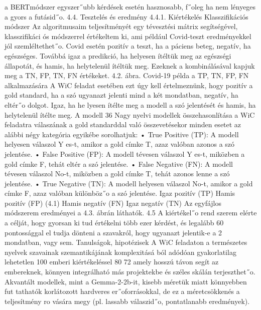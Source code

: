 \documentclass[12pt]{report}
\theoremstyle{definition}
\begin{document}
 a BERTmódszer egyszer˝ubb kérdések esetén hasznosabb, f˝oleg ha nem lényeges a gyors
 a futásid˝o.
 4.4. Tesztelés és eredmény
 4.4.1. Kiértékelés
 Klasszifikációs módszer
 Az algoritmusaim teljesítményét egy tévesztési mátrix segítségével, klasszifikáci
ós módszerrel értékeltem ki, ami például Covid-teszt eredményekkel jól szemléltethet˝o.
 Covid esetén pozitív a teszt, ha a páciens beteg, negatív, ha egészséges. Továbbá igaz a
 predikció, ha helyesen ítéltük meg az egészségi állapotát, és hamis, ha helytelenül ítéltük
 meg. Ezeknek a kombinálásával kapjuk meg a TN, FP, TN, FN értékeket.
 4.2. ábra. Covid-19 példa a TP, TN, FP, FN alkalmazására
 A WiC feladat esetében ezt úgy kell értelmeznünk, hogy pozitív a gold standard,
 ha a szó ugyanazt jelenti mind a két mondatban, negatív, ha eltér˝o dolgot. Igaz, ha he
lyesen ítélte meg a modell a szó jelentését és hamis, ha helytelenül ítélte meg. A modell
 36
Nagy nyelvi modellek összehasonlítása a WiC feladatra
 válaszának a gold standarddal való összevetésekor minden esetet az alábbi négy kategória
 egyikébe sorolhatjuk:
 • True Positive (TP): A modell helyesen válaszol Y es-t, amikor a gold címke T,
 azaz valóban azonos a szó jelentése.
 • False Positive (FP): A modell tévesen válaszol Y es-t, miközben a gold címke F,
 tehát eltér a szó jelentése.
 • False Negative (FN): A modell tévesen válaszol No-t, miközben a gold címke T,
 tehát azonos lenne a szó jelentése.
 • True Negative (TN): A modell helyesen válaszol No-t, amikor a gold címke F,
 azaz valóban különböz˝o a szó jelentése.
 Igaz pozitív (TP)
 Hamis pozitív (FP)
 (4.1)
 Hamis negatív (FN) Igaz negatív (TN)
 Az egyfájlos módszerem eredményei a 4.3. ábrán láthatók. 4.5 A kiértékel˝o rend
szerem elérte a célját, hogy gyorsan ki tud értékelni több ezer kérdést, és legalább 60%
 pontossággal el tudja dönteni a szavakról, hogy ugyanazt jelentik-e a 2 mondatban, vagy
 sem.
 Tanulságok, hipotézisek
 A WiC feladaton a természetes nyelvek szavainak szemantikájának komplexitásá
ból adódóan gyakorlatilag lehetetlen 100%
 emberi kiértékeléssel 80%
72%
 amely hosszú távon segít az embereknek, könnyen integrálható más projektekbe és széles
 skálán terjeszthet˝o.
 Akvantált modellek, mint a Gemma-2-2b-it, kisebb méretük miatt könnyebben fut
tathatók korlátozott hardveres er˝oforrásokkal, de ez a méretcsökkenés a teljesítmény ro
vására megy (pl. lassabb válaszid˝o, pontatlanabb eredmények).
\end{document}
